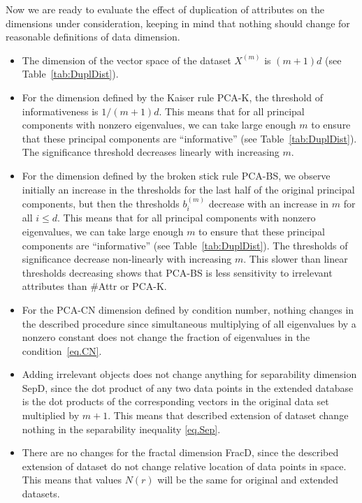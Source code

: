 \documentclass[entropy,article,submit,moreauthors,pdftex]{Definitions/mdpi}
\begin{document}
Now we are ready to evaluate the effect of duplication of attributes on the dimensions under consideration, keeping in mind that nothing should change for reasonable definitions of data dimension.
\begin{itemize}
  \item The dimension of the vector space of the dataset $X^{(m)}$ is $(m+1)d$ (see Table~\ref{tab:DuplDist}).
  \item For the dimension defined by the Kaiser rule PCA-K, the threshold of informativeness is $1/(m+1)d$. This means that for all principal components with nonzero eigenvalues, we can take large enough $m$ to ensure that these principal components are ``informative'' (see Table~\ref{tab:DuplDist}). The significance threshold decreases linearly with increasing $m$.
  \item For the dimension defined by the broken stick rule PCA-BS, we observe initially an increase in the thresholds for the last half of the original principal components, but then the thresholds $b^{(m)}_i$ decrease with an increase in $m$ for all $i\le d$. This means that for all principal components with nonzero eigenvalues, we can take large enough $m$ to ensure that these principal components are ``informative''  (see Table~\ref{tab:DuplDist}). The thresholds of significance decrease non-linearly with increasing $m$. This slower than linear thresholds decreasing shows that PCA-BS is less sensitivity to irrelevant attributes than \#Attr or PCA-K.
  \item For the PCA-CN dimension defined by condition number, nothing changes in the described procedure since simultaneous multiplying of all eigenvalues by a nonzero constant does not change the fraction of eigenvalues in the condition~\eqref{eq.CN}.
  \item Adding irrelevant objects does not change anything for separability dimension SepD, since the dot product of any two data points in the extended database is the dot products of the corresponding vectors in the original data set multiplied by $m+1$. This means that described extension of dataset change nothing in the separability inequality \eqref{eq.Sep}.
  \item There are no changes for the fractal dimension FracD, since the described extension of dataset do not change relative location of data points in space. This means that values $N(r)$ will be the same for original and extended datasets.
\end{itemize}
\end{document}
